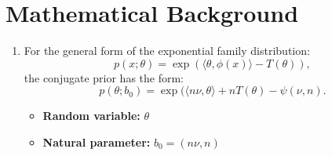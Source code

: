 \documentclass{article}
\begin{document}
\section{Mathematical Background}
\begin{enumerate}
    \item For the general form of the exponential family distribution:
    \[ p(x;\theta)=\exp\left(\langle\theta,\phi(x)\rangle-T(\theta)\right), \]
    the conjugate prior has the form:
    \[ p(\theta;b_0)=\exp(\langle n\nu,\theta\rangle+nT(\theta)-\psi(\nu,n). \]
    \begin{itemize}
        \item \textbf{Random variable:} $\theta$
        \item \textbf{Natural parameter:} $b_0=(n\nu,n)$
    \end{itemize}
\end{enumerate}
\end{document}
